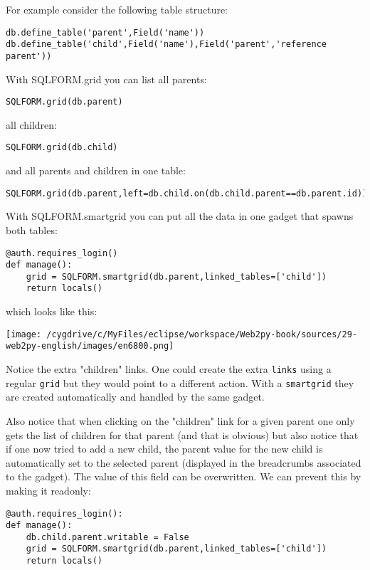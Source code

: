\documentclass[justified,sixbynine,notoc]{tufte-book}
\def\ft{\small\tt}
\begin{document}
\begin{fullwidth}
For example consider the following table structure:

\begin{lstlisting}
db.define_table('parent',Field('name'))
db.define_table('child',Field('name'),Field('parent','reference parent'))
\end{lstlisting}

With SQLFORM.grid you can list all parents:

\begin{lstlisting}
SQLFORM.grid(db.parent)
\end{lstlisting}
all children:
\begin{lstlisting}
SQLFORM.grid(db.child)
\end{lstlisting}
and all parents and children in one table:
\begin{lstlisting}
SQLFORM.grid(db.parent,left=db.child.on(db.child.parent==db.parent.id))
\end{lstlisting}

With SQLFORM.smartgrid you can put all the data in one gadget that spawns both tables:

\begin{lstlisting}
@auth.requires_login()
def manage():
    grid = SQLFORM.smartgrid(db.parent,linked_tables=['child'])
    return locals()
\end{lstlisting}
\noindent which looks like this:


\goodbreak\begin{center}\texttt{[image: /cygdrive/c/MyFiles/eclipse/workspace/Web2py-book/sources/29-web2py-english/images/en6800.png]}\end{center}


Notice the extra "children" links. One could create the extra {\ft links} using a regular {\ft grid} but they would point to a different action. With a {\ft smartgrid} they are created automatically and handled by the same gadget.

Also notice that when clicking on the "children" link for a given parent one only gets the list of children for that parent (and that is obvious) but also notice that if one now tried to add a new child, the parent value for the new child is automatically set to the selected parent (displayed in the breadcrumbs associated to the gadget). The value of this field can be overwritten. We can prevent this by making it readonly:

\begin{lstlisting}
@auth.requires_login():
def manage():
    db.child.parent.writable = False
    grid = SQLFORM.smartgrid(db.parent,linked_tables=['child'])
    return locals()
\end{lstlisting}


\end{fullwidth}
\end{document}
